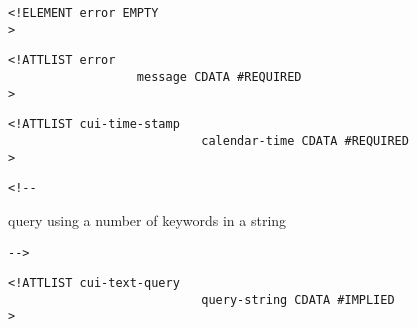 \begin{verbatim}
<!ELEMENT error EMPTY 
>\end{verbatim}

\begin{verbatim}
<!ATTLIST error 
                  message CDATA #REQUIRED
>\end{verbatim}

\begin{verbatim}
<!ATTLIST cui-time-stamp 
                           calendar-time CDATA #REQUIRED
>\end{verbatim}

\begin{verbatim}<!--\end{verbatim}
        query using a number of keywords in a string
      
 \begin{verbatim}-->\end{verbatim}



\begin{verbatim}
<!ATTLIST cui-text-query 
                           query-string CDATA #IMPLIED
>\end{verbatim}


